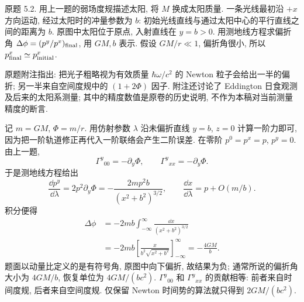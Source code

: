 \begin{exercise}
原题 5.2. 用上一题的弱场度规描述太阳, 将 $M$ 换成太阳质量. 一条光线最初沿 $+x$ 方向运动, 经过太阳时的冲量参数为 $b$: 初始光线直线与通过太阳中心的平行直线之间的距离为 $b$. 原图中太阳位于原点, 入射直线在 $y=b>0$. 用测地线方程求偏折角 $\Delta\phi=(p^y/p^x)_{\rm final}$, 用 $GM,b$ 表示. 假设 $GM/r\ll1$, 偏折角很小, 所以 $p^x_{\rm final}\simeq p^x_{\rm initial}$.

原题附注指出: 把光子粗略视为有效质量 $\hbar\omega/c^2$ 的 Newton 粒子会给出一半的偏折; 另一半来自空间度规中的 $(1+2\Phi)$ 因子. 附注还讨论了 Eddington 日食观测及后来的太阳系测量; 其中的精度数值是原卷的历史说明, 不作为本稿对当前测量精度的断言.
\end{exercise}
\begin{solution}
记 $m=GM$, $\Phi=m/r$. 用仿射参数 $\lambda$ 沿未偏折直线 $y=b$, $z=0$ 计算一阶力即可, 因为把一阶轨道修正再代入一阶联络会产生二阶误差. 在零阶 $p^0=p^x=p$, $p^y=0$. 由上一题,
\[
\Gamma^y{}_{00}=-\partial_y\Phi,\qquad
\Gamma^y{}_{xx}=-\partial_y\Phi.
\]
于是测地线方程给出
\[
\frac{\dd p^y}{\dd\lambda}
=2p^2\partial_y\Phi
=-\frac{2mp^2b}{(x^2+b^2)^{3/2}},\qquad
\frac{\dd x}{\dd\lambda}=p+O(m/b).
\]
积分便得
\begin{align*}
\Delta\phi
&=-2mb\int_{-\infty}^{\infty}\frac{\dd x}{(x^2+b^2)^{3/2}}\\
&=-2mb\left[\frac{x}{b^2\sqrt{x^2+b^2}}\right]_{-\infty}^{\infty}
=-\frac{4GM}{b}.
\end{align*}
题面以动量比定义的是有符号角, 原图中向下偏折, 故结果为负; 通常所说的偏折角大小为 $4GM/b$, 恢复单位为 $4GM/(bc^2)$. $\Gamma^y{}_{00}$ 和 $\Gamma^y{}_{xx}$ 的贡献相等: 前者来自时间度规, 后者来自空间度规. 仅保留 Newton 时间势的算法就只得到 $2GM/(bc^2)$.
\end{solution}

